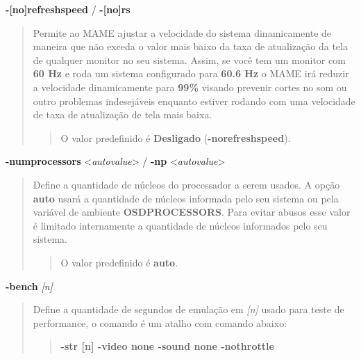 \documentclass[letterpaper,10pt,brazil]{sphinxmanual}
\begin{document}
\label{commandline/commandline-all:mame-commandline-norefreshspeed}
\textbf{-{[}no{]}refreshspeed} / \textbf{-{[}no{]}rs}
\begin{quote}

Permite ao MAME ajustar a velocidade do sistema dinamicamente de
maneira que não exceda o valor mais baixo da taxa de atualização da
tela de qualquer monitor no seu sistema. Assim, se você tem um
monitor com \textbf{60 Hz} e roda um sistema configurado para \textbf{60.6 Hz}
o MAME irá reduzir a velocidade dinamicamente para \textbf{99\%} visando
prevenir cortes no som ou outro problemas indesejáveis enquanto
estiver rodando com uma velocidade de taxa de atualização de tela
mais baixa.
\begin{quote}

O valor predefinido é \textbf{Desligado} (\textbf{-norefreshspeed}).
\end{quote}
\end{quote}
\label{commandline/commandline-all:mame-commandline-numprocessors}
\textbf{-numprocessors} \textless{}\emph{auto\textbar{}value}\textgreater{} / \textbf{-np} \textless{}\emph{auto\textbar{}value}\textgreater{}
\begin{quote}

Define a quantidade de núcleos do processador a serem usados.
A opção \textbf{auto} usará a quantidade de núcleos informada pelo seu
sistema ou pela variável de ambiente \textbf{OSDPROCESSORS}. Para evitar
abusos esse valor é limitado internamente a quantidade de núcleos
informados pelo seu sistema.
\begin{quote}

O valor predefinido é \textbf{auto}.
\end{quote}
\end{quote}
\label{commandline/commandline-all:mame-commandline-bench}
\textbf{-bench} \emph{{[}n{]}}
\begin{quote}

Define a quantidade de segundos de emulação em \emph{{[}n{]}} usado para
teste de performance, o comando é um atalho com comando abaixo:
\begin{quote}

\textbf{-str {[}n{]} -video none -sound none -nothrottle}
\end{quote}
\end{quote}
\end{document}
